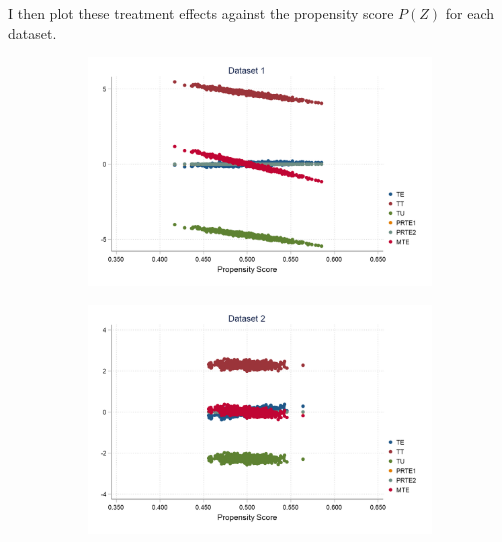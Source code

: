 \documentclass{article}
\begin{document}
\begin{solution}
I then plot these treatment effects against the propensity score $P(Z)$ for each dataset.
\begin{figure}[H]
    \centering
    \caption{$P(D=1|X)$ for each of the five datasets}
    \begin{subfigure}[b]{0.43\textwidth}
        \centering
        \includegraphics[width=\textwidth]{ps2Heckman/figures/q8_partb_d1_all.png}
    \end{subfigure}
    \begin{subfigure}[b]{0.43\textwidth}
        \centering
        \includegraphics[width=\textwidth]{ps2Heckman/figures/q8_partb_d2_all.png}
    \end{subfigure}
    \begin{subfigure}[b]{0.43\textwidth}
        \centering

\end{subfigure}
\end{figure}
\end{solution}
\end{document}

